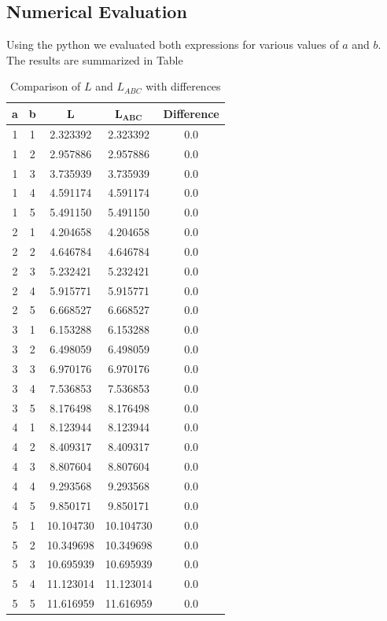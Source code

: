 \documentclass[a4paper, 12pt]{report}
\begin{document}
    \subsection{Numerical Evaluation}
    Using the python we evaluated both expressions for various values of $a$ and $b$.\\
    The results are summarized in Table
    \begin{table}[H]
        \centering
        \begin{tabular}{|c|c|c|c|c|}
            \hline
            \textbf{a} & \textbf{b} & $\bm{L}$ & $\bm{L_{ABC}}$ & \textbf{Difference} \\
            \hline
            1 & 1 & 2.323392 & 2.323392 & 0.0 \\
            1 & 2 & 2.957886 & 2.957886 & 0.0 \\
            1 & 3 & 3.735939 & 3.735939 & 0.0 \\
            1 & 4 & 4.591174 & 4.591174 & 0.0 \\
            1 & 5 & 5.491150 & 5.491150 & 0.0 \\
            2 & 1 & 4.204658 & 4.204658 & 0.0 \\
            2 & 2 & 4.646784 & 4.646784 & 0.0 \\
            2 & 3 & 5.232421 & 5.232421 & 0.0 \\
            2 & 4 & 5.915771 & 5.915771 & 0.0 \\
            2 & 5 & 6.668527 & 6.668527 & 0.0 \\
            3 & 1 & 6.153288 & 6.153288 & 0.0 \\
            3 & 2 & 6.498059 & 6.498059 & 0.0 \\
            3 & 3 & 6.970176 & 6.970176 & 0.0 \\
            3 & 4 & 7.536853 & 7.536853 & 0.0 \\
            3 & 5 & 8.176498 & 8.176498 & 0.0 \\
            4 & 1 & 8.123944 & 8.123944 & 0.0 \\
            4 & 2 & 8.409317 & 8.409317 & 0.0 \\
            4 & 3 & 8.807604 & 8.807604 & 0.0 \\
            4 & 4 & 9.293568 & 9.293568 & 0.0 \\
            4 & 5 & 9.850171 & 9.850171 & 0.0 \\
            5 & 1 & 10.104730 & 10.104730 & 0.0 \\
            5 & 2 & 10.349698 & 10.349698 & 0.0 \\
            5 & 3 & 10.695939 & 10.695939 & 0.0 \\
            5 & 4 & 11.123014 & 11.123014 & 0.0 \\
            5 & 5 & 11.616959 & 11.616959 & 0.0 \\
            \hline
        \end{tabular}
        \caption{Comparison of $L$ and $L_{ABC}$ with differences}
    \end{table}
        \vspace{-2em}
        
\end{document}

